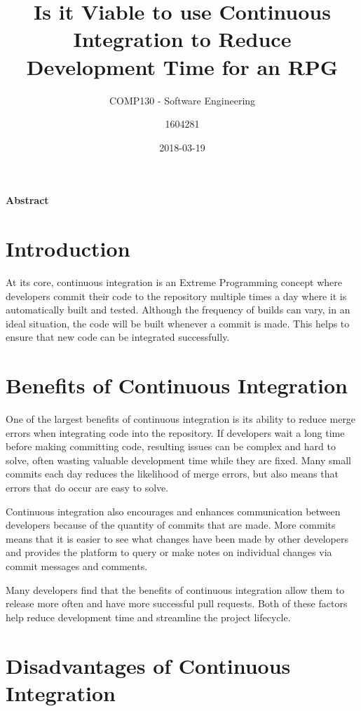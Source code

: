 \documentclass{scrartcl}
\title{Is it Viable to use Continuous Integration to Reduce Development Time for an RPG}
\subtitle{COMP130 - Software Engineering}
\date{2018-03-19}
\author{1604281}
\begin{document}
\maketitle
{}

\paragraph{Abstract}


\section{Introduction}

At its core, continuous integration is an Extreme Programming concept where developers commit their code to the repository multiple times a day where it is automatically built and tested. \cite{leppanen2015highways} Although the frequency of builds can vary, in an ideal situation, the code will be built whenever a commit is made. This helps to ensure that new code can be integrated successfully.


\section{Benefits of Continuous Integration}

One of the largest benefits of continuous integration is its ability to reduce merge errors when integrating code into the repository. If developers wait a long time before making committing code, resulting issues can be complex and hard to solve, often wasting valuable development time while they are fixed. Many small commits each day reduces the likelihood of merge errors, but also means that errors that do occur are easy to solve. \cite{bibid}

Continuous integration also encourages and enhances communication between developers because of the quantity of commits that are made. More commits means that it is easier to see what changes have been made by other developers and provides the platform to query or make notes on individual changes via commit messages and comments.

Many developers find that the benefits of continuous integration allow them to release more often and have more successful pull requests. Both of these factors help reduce development time and streamline the project lifecycle. \cite{hilton2016usage}

\section{Disadvantages of Continuous Integration}
\end{document}
